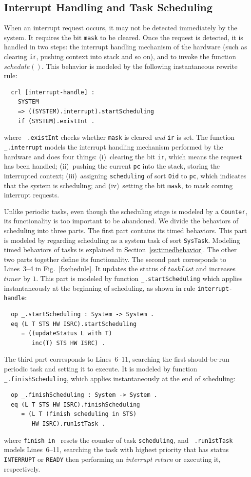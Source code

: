 \documentclass[journal]{IEEEtranTIE}
\begin{document}
\subsection{Interrupt Handling and Task Scheduling}
\label{ss:inthandling}
When an interrupt request occurs, it may not be detected immediately
by the system. It requires the bit \verb|mask| to be cleared. Once the
request is detected, it is handled in two steps: the interrupt
handling mechanism of the hardware (such as clearing \verb|ir|,
pushing context into stack and so on), and to invoke the function
$\mathit{schedule()}$. This behavior is modeled by the following
instantaneous rewrite rule:
\begin{verbatim}
  crl [interrupt-handle] :
    SYSTEM 
    => ((SYSTEM).interrupt).startScheduling
    if (SYSTEM).existInt .
\end{verbatim}
where \verb|_.existInt| checks whether \verb|mask| is cleared
\emph{and} \verb|ir| is set. The function \verb|_.interrupt| models
the interrupt handling mechanism performed by the hardware and does
four things: (i)~clearing the bit \verb|ir|, which means the request
has been handled; (ii)~pushing the current \verb|pc| into the stack,
storing the interrupted context; (iii)~assigning \verb|scheduling| of
sort \verb|Oid| to \verb|pc|, which indicates that the system is
scheduling; and (iv)~setting the bit \verb|mask|, to mask coming
interrupt requests.

Unlike periodic tasks, even though the scheduling stage is modeled by
a \verb|Counter|, its functionality is too important to be abandoned.
We divide the behaviors of scheduling into three parts.  The first
part contains its timed behaviors. This part is modeled by regarding
scheduling as a system task of sort \verb|SysTask|. Modeling timed
behaviors of tasks is explained in Section~\ref{ss:timedbehavior}.
The other two parts together define its functionality. The second part
corresponds to Lines~3--4 in Fig.~\ref{f:schedule}. It updates the
status of $\mathit{taskList}$ and increases $\mathit{timer}$ by
$1$. This part is modeled by function \verb|_.startScheduling| which
applies instantaneously at the beginning of scheduling, as shown in
rule \verb|interrupt-handle|:
\begin{verbatim}
  op _.startScheduling : System -> System .
  eq (L T STS HW ISRC).startScheduling 
     = ((updateStatus L with T) 
        inc(T) STS HW ISRC) .
\end{verbatim}
The third part corresponds to Lines~6--11, searching the first
should-be-run periodic task and setting it to execute. It is modeled
by function \verb|_.finishScheduling|, which applies instantaneously
at the end of scheduling:
\begin{verbatim}
  op _.finishScheduling : System -> System .
  eq (L T STS HW ISRC).finishScheduling
     = (L T (finish scheduling in STS) 
        HW ISRC).run1stTask .
\end{verbatim}
where \verb|finish_in_| resets the counter of task \verb|scheduling|,
and \verb|_.run1stTask| models Lines~6--11,
searching the task with highest priority that has status
\verb|INTERRUPT| or \verb|READY| then performing an \emph{interrupt
  return} or executing it, respectively.
\end{document}
